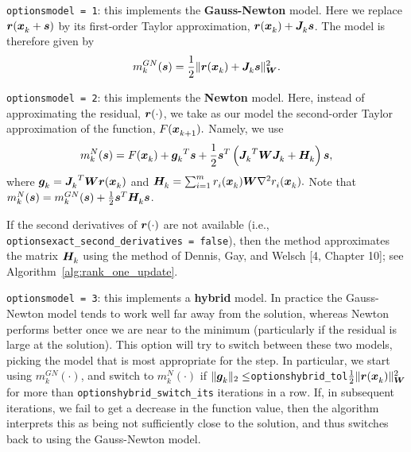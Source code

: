 \begin{description}
  \item {\tt options\ct model = 1}: this implements the {\bf Gauss-Newton} model.  Here we replace $\vr(\iter[k]{\vx} + \vs)$ by its first-order Taylor approximation, $\vr(\iter{\vx}) + \iter{\vJ}\vs$. The model is therefore given by    \begin{equation}
m_k^{GN}(\vs) = \frac{1}{2} \|\vr(\iter{\vx}) + \iter{\vJ}\vs\|_\vW^2.
\label{eq:gauss-newton-model}
\end{equation}
\item {\tt options\ct model = 2}: this implements the {\bf Newton} model.  
Here, instead of approximating the residual, $\vr(\cdot)$, we take as our model the second-order Taylor approximation of the function, $F(\iter[k+1]{\vx}).$  Namely, we use 
\begin{equation}
  \label{eq:newton-model}
  m_k^{N}(\vs) = F(\iter{\vx}) + {\iter{\vg}}^T\vs + \frac{1}{2}\vs^T\left( {\iter{\vJ}}^T \vW \iter{\vJ} + \iter{\vH}\right) \vs,
\end{equation}
where $\iter{\vg} = {\iter{\vJ}}^T\vW \vr(\iter{\vx})$ and $\iter{\vH} = \sum_{i=1}^m\iter[i]{r}(\iter{\vx}) \vW \nabla^2 \iter[i]{r}(\iter{\vx}).$
Note that $m_k^{N}(\vs) = m_k^{GN}(\vs) + \frac{1}{2}\vs^T\iter{\vH} \vs$.  

If the second derivatives of $\vr(\cdot)$ are not available 
(i.e., {\tt options\ct exact\_second\_derivatives = false}), 
then the method approximates the matrix $\iter{\vH}$ using the method of Dennis, Gay, and Welsch [4, Chapter 10]; 
see Algorithm~\ref{alg:rank_one_update}.


\item {\tt options\ct model = 3}: this implements a {\bf hybrid} model.  
In practice the Gauss-Newton model tends to work well far away from the solution, whereas
Newton performs better once we are near to the minimum (particularly if the residual is 
large at the solution).  
This option will try to switch between these two models, picking the model that is most appropriate for the step.  
In particular, we start using $m_k^{GN}(\cdot)$, 
and switch to $m_k^{N}(\cdot)$ if $\|{\iter{\vg}}\|_2 \leq ${\tt options\ct hybrid\_tol}$\frac{1}{2}\|\vr(\iter{\vx})\|^2_\vW$ for more than {\tt options\ct hybrid\_switch\_its} iterations in a row. If, in subsequent iterations, we fail to get 
a decrease in the function value, then the algorithm interprets this as being not sufficiently close to the solution, and thus switches back to using the Gauss-Newton model.


\end{description}
